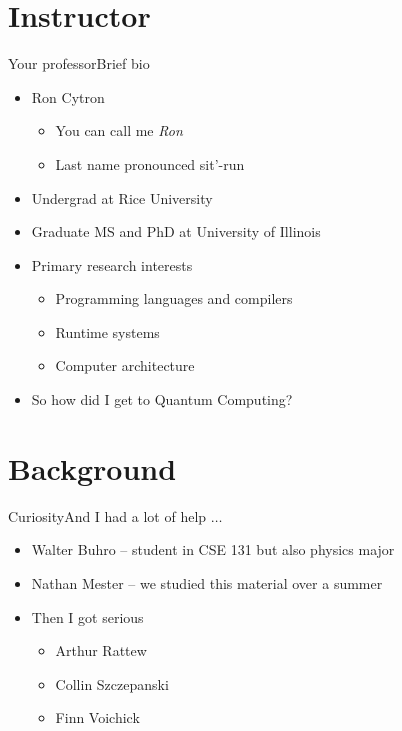\section{Instructor}
\begin{frame}{Your professor}{Brief bio}
\begin{itemize}
    \item Ron Cytron
    \begin{itemize}
        \item You can call me \emph{Ron}
        \item Last name pronounced sit'-run
    \end{itemize}
    \item Undergrad at Rice University
    \item Graduate MS and PhD at University of Illinois
    \item Primary research interests
    \begin{itemize}
        \item Programming languages and compilers
        \item Runtime systems
        \item Computer architecture
    \end{itemize}
    \item So how did I get to Quantum Computing?
\end{itemize}
    
\end{frame}

\section{Background}
\begin{frame}{Curiosity}{And I had a lot of help $\ldots$}
\begin{itemize}
    \item Walter Buhro -- student in CSE 131 but also physics major
    \item Nathan Mester -- we studied this material over a summer
    \item Then I got serious
    \begin{itemize}
        \item Arthur Rattew
        \item Collin Szczepanski
        \item Finn Voichick
    \end{itemize}
\end{itemize}
    
\end{frame}

